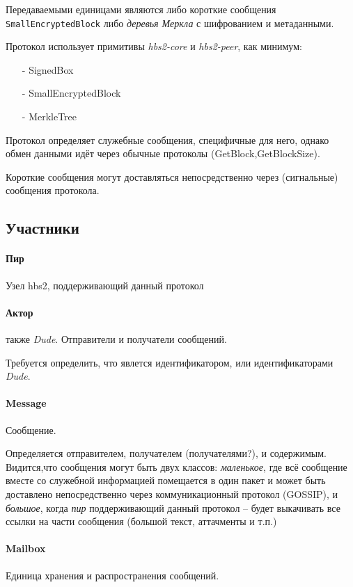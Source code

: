 \documentclass[11pt,a4paper]{article}
\newcommand{\term}[2]{\textit{#2}}
\newcommand{\Peer}{\term{peer}{пир}}
\newcommand{\Dude}{\term{dude}{Dude}}
\begin{document}
Передаваемыми единицами являются либо короткие сообщения
\texttt{SmallEncryptedBlock} либо \term{merkle}{деревья Меркла} с шифрованием и
метаданными.

Протокол использует примитивы \textit{hbs2-core} и \textit{hbs2-peer}, как
минимум:

\begin{itemize}
  \item[-] SignedBox
  \item[-] SmallEncryptedBlock
  \item[-] MerkleTree
\end{itemize}

Протокол определяет служебные сообщения, специфичные для него, однако обмен
данными идёт через обычные протоколы (GetBlock,GetBlockSize).

Короткие сообщения могут доставляться непосредственно через (сигнальные)
сообщения протокола.

\subsection{Участники}

\paragraph{Пир} Узел hbs2, поддерживающий данный протокол

\paragraph{Актор} также \term{dude}{Dude}.  Отправители и получатели сообщений.

Требуется определить, что явлется идентификатором, или идентификаторами \Dude{}.

\paragraph{Message} Сообщение.

Определяется отправителем, получателем (получателями?), и содержимым.
Видится,что сообщения могут быть двух классов: \textit{маленькое}, где всё
сообщение вместе со служебной информацией помещается в один пакет и может быть
доставлено непосредственно через коммуникационный протокол (GOSSIP), и
\textit{большое}, когда \Peer{} поддерживающий данный протокол -- будет
выкачивать все ссылки на части сообщения (большой текст, аттачменты и т.п.)

\paragraph{Mailbox} Единица хранения и распространения сообщений.
\end{document}
